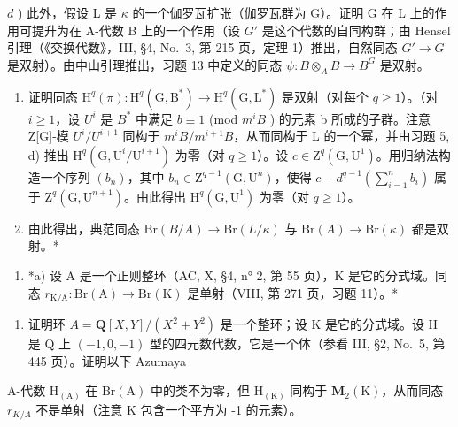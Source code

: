 \(d\) ) 此外，假设 L 是 \(\kappa\) 的一个伽罗瓦扩张（伽罗瓦群为 G）。证明 G 在 L 上的作用可提升为在 A-代数 B 上的一个作用（设 \(G'\) 是这个代数的自同构群；由 Hensel 引理（《交换代数》，III, §4, No.~3, 第 215 页，定理 1）推出，自然同态 \(G' \to G\) 是双射）。由中山引理推出，习题 13 中定义的同态 \(\psi : B \otimes_A B \to B^G\) 是双射。

\begin{enumerate}
\def\labelenumi{\alph{enumi})}
\setcounter{enumi}{4}
\item
  证明同态 \(\mathrm{H}^{q}(\pi):\mathrm{H}^{q}(\mathrm{G},\mathrm{B}^{*})\to\mathrm{H}^{q}(\mathrm{G},\mathrm{L}^{*})\) 是双射（对每个 \(q\geqslant1\)）。（对 \(i\geqslant1\)，设 \(U^{i}\) 是 \(B^{*}\) 中满足 \(b\equiv1\) (mod \(m^{i}B\) ) 的元素 b 所成的子群。注意 Z{[}G{]}-模 \(U^{i}/U^{i+1}\) 同构于 \(m^{i}B/m^{i+1}B\)，从而同构于 L 的一个幂，并由习题 5, d) 推出 \(\mathrm{H}^{q}(\mathrm{G},\mathrm{U}^{i}/\mathrm{U}^{i+1})\) 为零（对 \(q\geqslant1\)）。设 \(c\in\mathrm{Z}^{q}(\mathrm{G},\mathrm{U}^{1})\)。用归纳法构造一个序列 \((b_{n})\)，其中 \(b_{n}\in\mathrm{Z}^{q-1}(\mathrm{G},\mathrm{U}^{n})\)，使得 \(c-d^{q-1}(\sum_{i=1}^{n}b_{i})\) 属于 \(\mathrm{Z}^{q}(\mathrm{G},\mathrm{U}^{n+1})\)。由此得出 \(\mathrm{H}^{q}(\mathrm{G},\mathrm{U}^{1})\) 为零（对 \(q\geqslant1\)）。
\item
  由此得出，典范同态 \(\mathrm{Br}(B/A)\to \mathrm{Br}(L/\kappa)\) 与 \(\mathrm{Br}(A)\to \mathrm{Br}(\kappa)\) 都是双射。*
\end{enumerate}

\begin{enumerate}
\def\labelenumi{\arabic{enumi})}
\setcounter{enumi}{14}
\tightlist
\item
  *a) 设 A 是一个正则整环（AC, X, §4, n° 2, 第 55 页），K 是它的分式域。同态 \(r_{\mathrm{K / A}}: \mathrm{Br(A)} \to \mathrm{Br(K)}\) 是单射（VIII, 第 271 页，习题 11）。*
\end{enumerate}

\begin{enumerate}
\def\labelenumi{\alph{enumi})}
\setcounter{enumi}{1}
\tightlist
\item
  证明环 \(A = \mathbf{Q}[X, Y]/(X^{2} + Y^{2})\) 是一个整环；设 K 是它的分式域。设 H 是 Q 上 \((-1, 0, -1)\) 型的四元数代数，它是一个体（参看 III, §2, No.~5, 第 445 页）。证明以下 Azumaya
\end{enumerate}

A-代数 \(\mathrm{H}_{(\mathrm{A})}\) 在 \(\mathrm{Br}(\mathrm{A})\) 中的类不为零，但 \(\mathrm{H}_{(\mathrm{K})}\) 同构于 \(\mathbf{M}_{2}(\mathrm{K})\)，从而同态 \(r_{K/A}\) 不是单射（注意 K 包含一个平方为 -1 的元素）。


